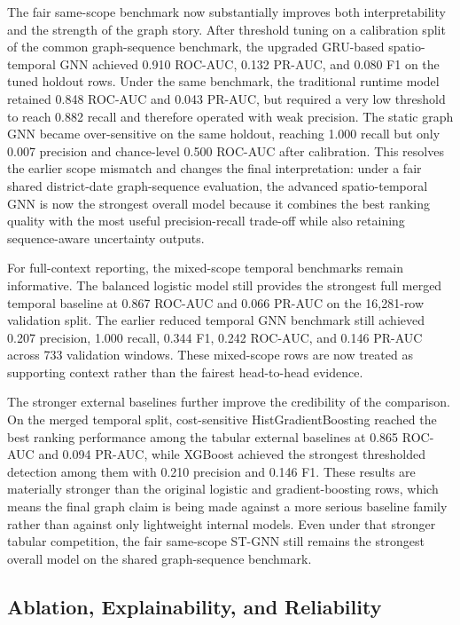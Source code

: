 \documentclass[pdflatex,sn-mathphys-num]{sn-jnl}
\begin{document}
The fair same-scope benchmark now substantially improves both interpretability and the strength of the graph story. After threshold tuning on a calibration split of the common graph-sequence benchmark, the upgraded GRU-based spatio-temporal GNN achieved 0.910 ROC-AUC, 0.132 PR-AUC, and 0.080 F1 on the tuned holdout rows. Under the same benchmark, the traditional runtime model retained 0.848 ROC-AUC and 0.043 PR-AUC, but required a very low threshold to reach 0.882 recall and therefore operated with weak precision. The static graph GNN became over-sensitive on the same holdout, reaching 1.000 recall but only 0.007 precision and chance-level 0.500 ROC-AUC after calibration. This resolves the earlier scope mismatch and changes the final interpretation: under a fair shared district-date graph-sequence evaluation, the advanced spatio-temporal GNN is now the strongest overall model because it combines the best ranking quality with the most useful precision-recall trade-off while also retaining sequence-aware uncertainty outputs.

For full-context reporting, the mixed-scope temporal benchmarks remain informative. The balanced logistic model still provides the strongest full merged temporal baseline at 0.867 ROC-AUC and 0.066 PR-AUC on the 16,281-row validation split. The earlier reduced temporal GNN benchmark still achieved 0.207 precision, 1.000 recall, 0.344 F1, 0.242 ROC-AUC, and 0.146 PR-AUC across 733 validation windows. These mixed-scope rows are now treated as supporting context rather than the fairest head-to-head evidence.

The stronger external baselines further improve the credibility of the comparison. On the merged temporal split, cost-sensitive HistGradientBoosting reached the best ranking performance among the tabular external baselines at 0.865 ROC-AUC and 0.094 PR-AUC, while XGBoost achieved the strongest thresholded detection among them with 0.210 precision and 0.146 F1. These results are materially stronger than the original logistic and gradient-boosting rows, which means the final graph claim is being made against a more serious baseline family rather than against only lightweight internal models. Even under that stronger tabular competition, the fair same-scope ST-GNN still remains the strongest overall model on the shared graph-sequence benchmark.

\subsection{Ablation, Explainability, and Reliability}
\end{document}
